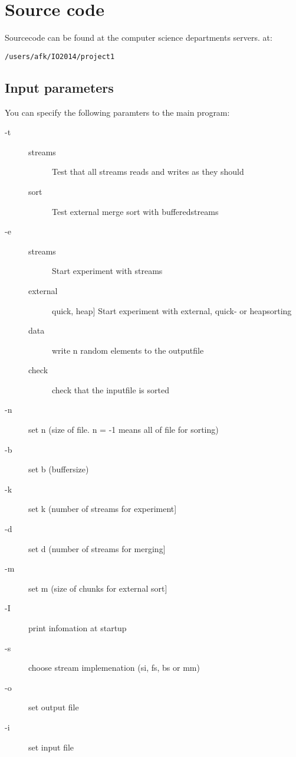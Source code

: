 \section{Source code}
Sourcecode can be found at the computer science departments servers. at:

\texttt{/users/afk/IO2014/project1}

\subsection{Input parameters}
You can specify the following paramters to the main program:
\begin{description}
  \item[-t]
	\begin{description}
		\item[streams] Test that all streams reads and writes as they should
		\item[sort] Test external merge sort with bufferedstreams
	\end{description}
  \item[-e]
	\begin{description}
		\item[streams] Start experiment with streams
		\item[external] quick, heap] Start experiment with external, quick- or heapsorting
		\item[data] write n random elements to the outputfile
		\item[check] check that the inputfile is sorted
	\end{description}
  \item[-n] set n (size of file. n  = -1 means all of file for sorting)
  \item[-b] set b (buffersize)
  \item[-k] set k (number of streams for experiment]
  \item[-d] set d (number of streams for merging]
  \item[-m] set m (size of chunks for external sort]
  \item[-I] print infomation at startup
  \item[-s] choose stream implemenation (si, fs, bs or mm)
  \item[-o] set output file
  \item[-i] set input file
\end{description}
